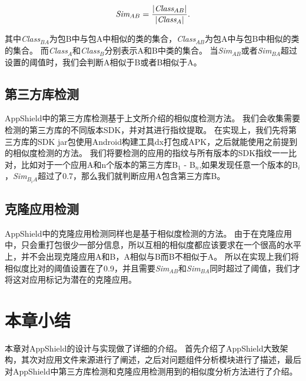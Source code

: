 \begin{equation}
	\emph{Sim$_{AB}$} = \frac{|\emph{Class$_{AB}$}|}{|\emph{Class$_{A}$}|}.
\end{equation}

其中\emph{Class$_{BA}$}为包B中与包A中相似的类的集合，\emph{Class$_{AB}$}为包A中与包B中相似的类的集合。
而\emph{Class$_{A}$}和\emph{Class$_{B}$}分别表示A和B中类的集合。
当\emph{Sim$_{AB}$}或者\emph{Sim$_{BA}$}超过设置的阈值时，我们会判断A相似于B或者B相似于A。

\subsection{第三方库检测}

AppShield中的第三方库检测基于上文所介绍的相似度检测方法。
我们会收集需要检测的第三方库的不同版本SDK，并对其进行指纹提取。
在实现上，我们先将第三方库的SDK jar包使用Android构建工具dx打包成APK，之后就能使用之前提到的相似度检测的方法。
我们将要检测的应用的指纹与所有版本的SDK指纹一一比对，比如对于一个应用A和n个版本的第三方库B$_{1}$ - B$_{n}$,如果发现任意一个版本的B$_{i}$，\emph{Sim$_{B_{i}A}$}超过了0.7，那么我们就判断应用A包含第三方库B。

\subsection{克隆应用检测}

AppShield中的克隆应用检测同样也是基于相似度检测的方法。
由于在克隆应用中，只会重打包很少一部分信息，所以互相的相似度都应该要求在一个很高的水平上，并不会出现克隆应用A和B，A相似与B而B不相似于A。
所以在实现上我们将相似度比对的阈值设置在了0.9，并且需要\emph{Sim$_{AB}$}和\emph{Sim$_{BA}$}同时超过了阈值，我们才将这对应用标记为潜在的克隆应用。

\section{本章小结}
\label{sec:appshield:conclusion}

本章对AppShield的设计与实现做了详细的介绍。
首先介绍了AppShield大致架构，其次对应用文件来源进行了阐述，之后对问题组件分析模块进行了描述，最后对AppShield中第三方库检测和克隆应用检测用到的相似度分析方法进行了介绍。